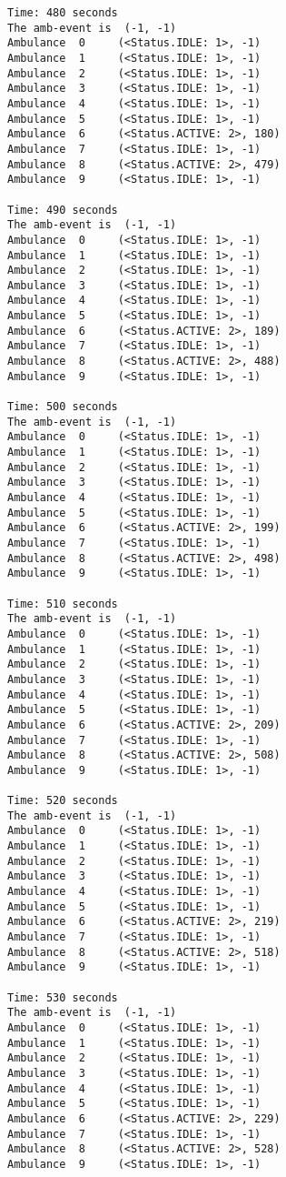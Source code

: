 \documentclass[11pt]{article}
\begin{document}
\begin{Verbatim}[commandchars=\\\{\}]
Time: 480 seconds
The amb-event is  (-1, -1)
Ambulance  0	 (<Status.IDLE: 1>, -1)
Ambulance  1	 (<Status.IDLE: 1>, -1)
Ambulance  2	 (<Status.IDLE: 1>, -1)
Ambulance  3	 (<Status.IDLE: 1>, -1)
Ambulance  4	 (<Status.IDLE: 1>, -1)
Ambulance  5	 (<Status.IDLE: 1>, -1)
Ambulance  6	 (<Status.ACTIVE: 2>, 180)
Ambulance  7	 (<Status.IDLE: 1>, -1)
Ambulance  8	 (<Status.ACTIVE: 2>, 479)
Ambulance  9	 (<Status.IDLE: 1>, -1)

Time: 490 seconds
The amb-event is  (-1, -1)
Ambulance  0	 (<Status.IDLE: 1>, -1)
Ambulance  1	 (<Status.IDLE: 1>, -1)
Ambulance  2	 (<Status.IDLE: 1>, -1)
Ambulance  3	 (<Status.IDLE: 1>, -1)
Ambulance  4	 (<Status.IDLE: 1>, -1)
Ambulance  5	 (<Status.IDLE: 1>, -1)
Ambulance  6	 (<Status.ACTIVE: 2>, 189)
Ambulance  7	 (<Status.IDLE: 1>, -1)
Ambulance  8	 (<Status.ACTIVE: 2>, 488)
Ambulance  9	 (<Status.IDLE: 1>, -1)

Time: 500 seconds
The amb-event is  (-1, -1)
Ambulance  0	 (<Status.IDLE: 1>, -1)
Ambulance  1	 (<Status.IDLE: 1>, -1)
Ambulance  2	 (<Status.IDLE: 1>, -1)
Ambulance  3	 (<Status.IDLE: 1>, -1)
Ambulance  4	 (<Status.IDLE: 1>, -1)
Ambulance  5	 (<Status.IDLE: 1>, -1)
Ambulance  6	 (<Status.ACTIVE: 2>, 199)
Ambulance  7	 (<Status.IDLE: 1>, -1)
Ambulance  8	 (<Status.ACTIVE: 2>, 498)
Ambulance  9	 (<Status.IDLE: 1>, -1)

Time: 510 seconds
The amb-event is  (-1, -1)
Ambulance  0	 (<Status.IDLE: 1>, -1)
Ambulance  1	 (<Status.IDLE: 1>, -1)
Ambulance  2	 (<Status.IDLE: 1>, -1)
Ambulance  3	 (<Status.IDLE: 1>, -1)
Ambulance  4	 (<Status.IDLE: 1>, -1)
Ambulance  5	 (<Status.IDLE: 1>, -1)
Ambulance  6	 (<Status.ACTIVE: 2>, 209)
Ambulance  7	 (<Status.IDLE: 1>, -1)
Ambulance  8	 (<Status.ACTIVE: 2>, 508)
Ambulance  9	 (<Status.IDLE: 1>, -1)

Time: 520 seconds
The amb-event is  (-1, -1)
Ambulance  0	 (<Status.IDLE: 1>, -1)
Ambulance  1	 (<Status.IDLE: 1>, -1)
Ambulance  2	 (<Status.IDLE: 1>, -1)
Ambulance  3	 (<Status.IDLE: 1>, -1)
Ambulance  4	 (<Status.IDLE: 1>, -1)
Ambulance  5	 (<Status.IDLE: 1>, -1)
Ambulance  6	 (<Status.ACTIVE: 2>, 219)
Ambulance  7	 (<Status.IDLE: 1>, -1)
Ambulance  8	 (<Status.ACTIVE: 2>, 518)
Ambulance  9	 (<Status.IDLE: 1>, -1)

Time: 530 seconds
The amb-event is  (-1, -1)
Ambulance  0	 (<Status.IDLE: 1>, -1)
Ambulance  1	 (<Status.IDLE: 1>, -1)
Ambulance  2	 (<Status.IDLE: 1>, -1)
Ambulance  3	 (<Status.IDLE: 1>, -1)
Ambulance  4	 (<Status.IDLE: 1>, -1)
Ambulance  5	 (<Status.IDLE: 1>, -1)
Ambulance  6	 (<Status.ACTIVE: 2>, 229)
Ambulance  7	 (<Status.IDLE: 1>, -1)
Ambulance  8	 (<Status.ACTIVE: 2>, 528)
Ambulance  9	 (<Status.IDLE: 1>, -1)


\end{Verbatim}
\end{document}

